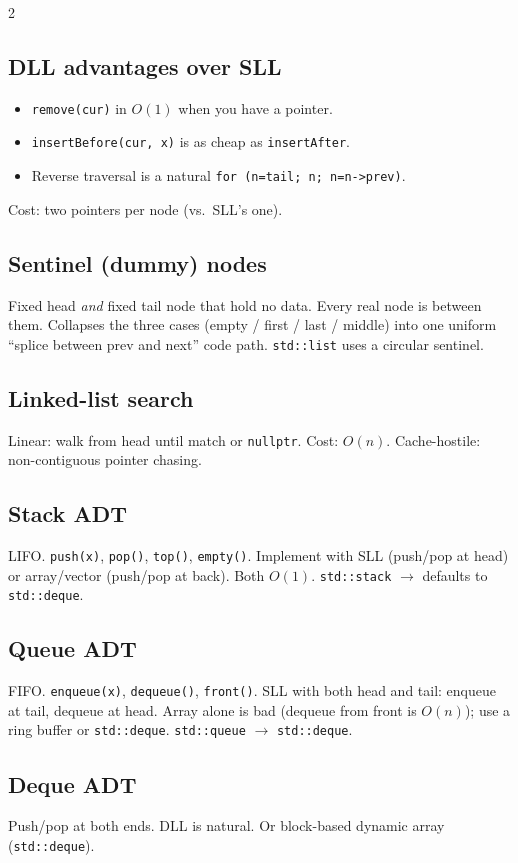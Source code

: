 \documentclass[10pt]{article}
\begin{document}
\begin{multicols}{2}
\subsection*{DLL advantages over SLL}
\begin{itemize}
    \item \texttt{remove(cur)} in $O(1)$ when you have a pointer.
    \item \texttt{insertBefore(cur, x)} is as cheap as \texttt{insertAfter}.
    \item Reverse traversal is a natural \texttt{for (n=tail; n; n=n->prev)}.
\end{itemize}
Cost: two pointers per node (vs.\ SLL's one).

\subsection*{Sentinel (dummy) nodes}
Fixed head \emph{and} fixed tail node that hold no data. Every real node
is between them. Collapses the three cases (empty / first / last /
middle) into one uniform ``splice between prev and next'' code path.
\texttt{std::list} uses a circular sentinel.

\columnbreak

\subsection*{Linked-list search}
Linear: walk from head until match or \texttt{nullptr}.
Cost: $O(n)$. Cache-hostile: non-contiguous pointer chasing.

\subsection*{Stack ADT}
LIFO. \texttt{push(x)}, \texttt{pop()}, \texttt{top()}, \texttt{empty()}.
Implement with SLL (push/pop at head) or array/vector (push/pop at
back). Both $O(1)$. \texttt{std::stack} $\to$ defaults to
\texttt{std::deque}.

\subsection*{Queue ADT}
FIFO. \texttt{enqueue(x)}, \texttt{dequeue()}, \texttt{front()}.
SLL with both head and tail: enqueue at tail, dequeue at head. Array
alone is bad (dequeue from front is $O(n)$); use a ring buffer or
\texttt{std::deque}. \texttt{std::queue} $\to$ \texttt{std::deque}.

\subsection*{Deque ADT}
Push/pop at both ends. DLL is natural. Or block-based dynamic array
(\texttt{std::deque}).


\end{multicols}
\end{document}
